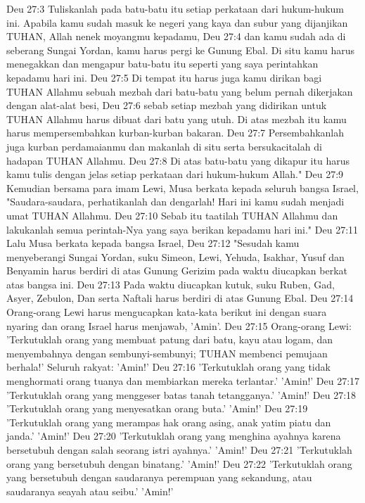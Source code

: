 Deu 27:3  Tuliskanlah pada batu-batu itu setiap perkataan dari hukum-hukum ini. Apabila kamu sudah masuk ke negeri yang kaya dan subur yang dijanjikan TUHAN, Allah nenek moyangmu kepadamu,
Deu 27:4  dan kamu sudah ada di seberang Sungai Yordan, kamu harus pergi ke Gunung Ebal. Di situ kamu harus menegakkan dan mengapur batu-batu itu seperti yang saya perintahkan kepadamu hari ini.
Deu 27:5  Di tempat itu harus juga kamu dirikan bagi TUHAN Allahmu sebuah mezbah dari batu-batu yang belum pernah dikerjakan dengan alat-alat besi,
Deu 27:6  sebab setiap mezbah yang didirikan untuk TUHAN Allahmu harus dibuat dari batu yang utuh. Di atas mezbah itu kamu harus mempersembahkan kurban-kurban bakaran.
Deu 27:7  Persembahkanlah juga kurban perdamaianmu dan makanlah di situ serta bersukacitalah di hadapan TUHAN Allahmu.
Deu 27:8  Di atas batu-batu yang dikapur itu harus kamu tulis dengan jelas setiap perkataan dari hukum-hukum Allah."
Deu 27:9  Kemudian bersama para imam Lewi, Musa berkata kepada seluruh bangsa Israel, "Saudara-saudara, perhatikanlah dan dengarlah! Hari ini kamu sudah menjadi umat TUHAN Allahmu.
Deu 27:10  Sebab itu taatilah TUHAN Allahmu dan lakukanlah semua perintah-Nya yang saya berikan kepadamu hari ini."
Deu 27:11  Lalu Musa berkata kepada bangsa Israel,
Deu 27:12  "Sesudah kamu menyeberangi Sungai Yordan, suku Simeon, Lewi, Yehuda, Isakhar, Yusuf dan Benyamin harus berdiri di atas Gunung Gerizim pada waktu diucapkan berkat atas bangsa ini.
Deu 27:13  Pada waktu diucapkan kutuk, suku Ruben, Gad, Asyer, Zebulon, Dan serta Naftali harus berdiri di atas Gunung Ebal.
Deu 27:14  Orang-orang Lewi harus mengucapkan kata-kata berikut ini dengan suara nyaring dan orang Israel harus menjawab, 'Amin'.
Deu 27:15  Orang-orang Lewi: 'Terkutuklah orang yang membuat patung dari batu, kayu atau logam, dan menyembahnya dengan sembunyi-sembunyi; TUHAN membenci pemujaan berhala!' Seluruh rakyat: 'Amin!'
Deu 27:16  'Terkutuklah orang yang tidak menghormati orang tuanya dan membiarkan mereka terlantar.' 'Amin!'
Deu 27:17  'Terkutuklah orang yang menggeser batas tanah tetangganya.' 'Amin!'
Deu 27:18  'Terkutuklah orang yang menyesatkan orang buta.' 'Amin!'
Deu 27:19  'Terkutuklah orang yang merampas hak orang asing, anak yatim piatu dan janda.' 'Amin!'
Deu 27:20  'Terkutuklah orang yang menghina ayahnya karena bersetubuh dengan salah seorang istri ayahnya.' 'Amin!'
Deu 27:21  'Terkutuklah orang yang bersetubuh dengan binatang.' 'Amin!'
Deu 27:22  'Terkutuklah orang yang bersetubuh dengan saudaranya perempuan yang sekandung, atau saudaranya seayah atau seibu.' 'Amin!'
